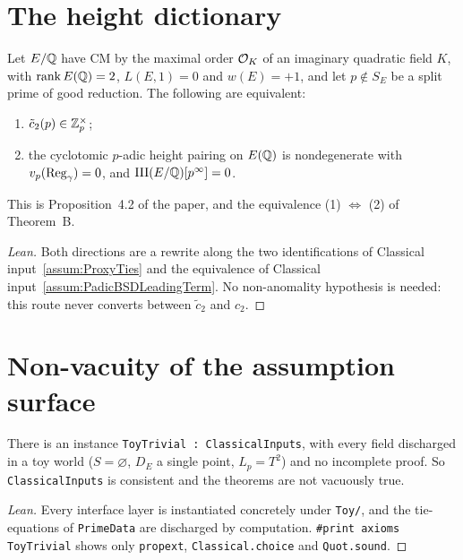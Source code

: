 \chapter{The height dictionary}
\label{ch:dictionary}

\begin{proposition}
  \label{prop:Dictionary}
  \leanok
  Let $E/\mathbb{Q}$ have CM by the maximal order ${\mathcal{O}_K}$ of an imaginary quadratic
  field $K$, with $\operatorname{rank} E(\mathbb{Q}) = 2$, $L(E,1) = 0$ and $w(E) = +1$, and let
  $p \notin S_E$ be a split prime of good reduction. The following are
  equivalent:
  \begin{enumerate}
    \item $\tilde c_2(p) \in \mathbb{Z}_p^\times$;
    \item the cyclotomic $p$-adic height pairing on $E(\mathbb{Q})$ is nondegenerate
      with $v_p(\operatorname{Reg}_\gamma) = 0$, and $\mathrm{III}(E/\mathbb{Q})[p^\infty] = 0$.
  \end{enumerate}
  This is Proposition~4.2 of the paper, and the equivalence (1) $\iff$ (2) of
  Theorem~B.
\end{proposition}
\begin{proof}[Lean]
  \leanok
  Both directions are a rewrite along the two identifications of
  Classical input~\ref{assum:ProxyTies} and the equivalence of Classical
  input~\ref{assum:PadicBSDLeadingTerm}. No non-anomality hypothesis is
  needed: this route never converts between $\tilde c_2$ and $c_2$.
\end{proof}

\chapter{Non-vacuity of the assumption surface}
\label{ch:nonvacuity}

\begin{theorem}
  \label{thm:AssumptionsSatisfiable}
  \leanok
  There is an instance \texttt{ToyTrivial : ClassicalInputs}, with every
  field discharged in a toy world ($S = \varnothing$, $D_E$ a single point,
  $L_p = T^2$) and no incomplete proof. So \texttt{ClassicalInputs} is
  consistent and the theorems are not vacuously true.
\end{theorem}
\begin{proof}[Lean]
  \leanok
  Every interface layer is instantiated concretely under \texttt{Toy/}, and
  the tie-equations of \texttt{PrimeData} are discharged by computation.
  \texttt{\#print axioms ToyTrivial} shows only \texttt{propext},
  \texttt{Classical.choice} and \texttt{Quot.sound}.
\end{proof}

